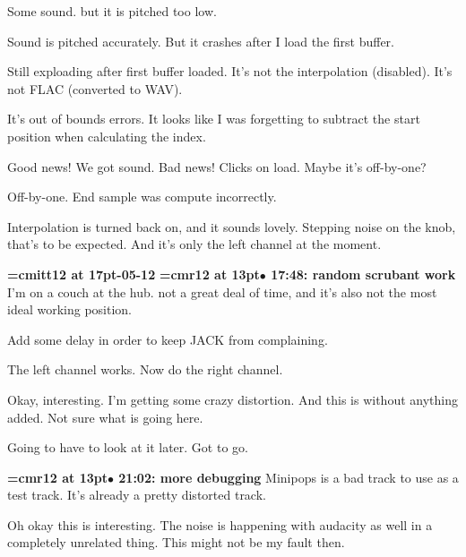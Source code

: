 Some sound. but it is pitched too low.
\par

Sound is pitched accurately. But it crashes after I load the first buffer.
\par

Still exploading after first buffer loaded. It's not the interpolation (disabled). It's not FLAC (converted to WAV).
\par

It's out of bounds errors. It looks like I was forgetting to subtract the start position when calculating the index.
\par

Good news! We got sound. Bad news! Clicks on load. Maybe it's off-by-one?
\par

Off-by-one. End sample was compute incorrectly.
\par

Interpolation is turned back on, and it sounds lovely. Stepping noise on the knob, that's to be expected. And it's only the left channel at the moment.
\par

{\medskip\noindent\bf\font\titlefont=cmitt12 at 17pt-05-12}\medskip
{\smallskip\noindent\bf\font\titlefont=cmr12 at 13pt\titlefont $\bullet$ 17:48: random scrubant work}\smallskip
I'm on a couch at the hub. not a great deal of time, and it's also not the most ideal working position.
\par

Add some delay in order to keep JACK from complaining.
\par

The left channel works. Now do the right channel.
\par

Okay, interesting. I'm getting some crazy distortion. And this is without anything added. Not sure what is going  here.
\par

Going to have to look at it later. Got to go.
\par

{\smallskip\noindent\bf\font\titlefont=cmr12 at 13pt\titlefont $\bullet$ 21:02: more debugging}\smallskip
Minipops is a bad track to use as a test track. It's already a pretty distorted track.
\par

Oh okay this is interesting. The noise is happening with audacity as well in a completely unrelated thing. This might not be my fault then.
\par

